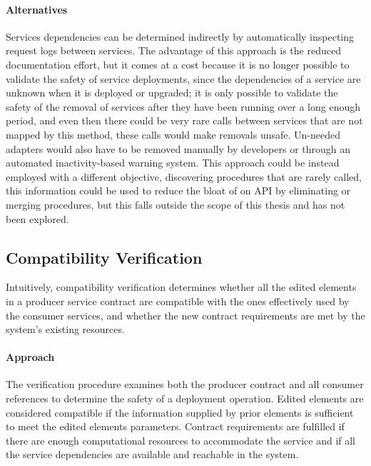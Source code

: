 \paragraph{Alternatives}
Services dependencies can be determined indirectly by automatically inspecting request logs between services.
The advantage of this approach is the reduced documentation effort, but it comes at a cost because
it is no longer possible to validate the safety of service deployments, since the dependencies of a service are unknown when it is deployed or upgraded;
it is only possible to validate the safety of the removal of services after they have been running over a long enough period,
and even then there could be very rare calls between services that are not mapped by this method, these calls would make removals unsafe.
Un-needed adapters would also have to be removed manually by developers or through an automated inactivity-based warning system.
This approach could be instead employed with a different objective, discovering procedures that are rarely called,
this information could be used to reduce the bloat of on API by eliminating or merging procedures,
but this falls outside the scope of this thesis and has not been explored.


\subsection{Compatibility Verification} %
\label{sec:compatibility_verification_design}

Intuitively, compatibility verification determines whether
all the edited elements in a producer service contract are compatible with the ones effectively
used by the consumer services, and whether the new contract requirements are met
by the system’s existing resources.

\paragraph{Approach}
The verification procedure examines both the producer contract and all consumer references to determine the safety of a deployment operation.
Edited elements are considered compatible if the information supplied by prior elements is sufficient to meet the edited elements parameters.
Contract requirements are fulfilled if there are enough computational resources to accommodate the service and if all the
service dependencies are available and reachable in the system.

